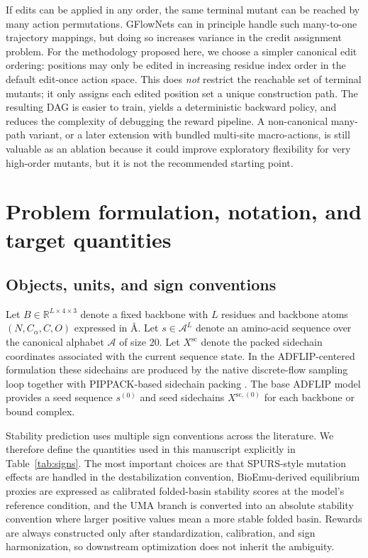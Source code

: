 \documentclass[11pt]{article}
\newcommand{\RR}{\mathbb{R}}
\newcommand{\angstrom}{\ensuremath{\text{\AA}}}
\newcommand{\Aset}{\mathcal{A}}
\begin{document}
If edits can be applied in any order, the same terminal mutant can be reached by many action permutations. GFlowNets can in principle handle such many-to-one trajectory mappings, but doing so increases variance in the credit assignment problem. For the methodology proposed here, we choose a simpler canonical edit ordering: positions may only be edited in increasing residue index order in the default edit-once action space. This does \emph{not} restrict the reachable set of terminal mutants; it only assigns each edited position set a unique construction path. The resulting DAG is easier to train, yields a deterministic backward policy, and reduces the complexity of debugging the reward pipeline. A non-canonical many-path variant, or a later extension with bundled multi-site macro-actions, is still valuable as an ablation because it could improve exploratory flexibility for very high-order mutants, but it is not the recommended starting point.

\section{Problem formulation, notation, and target quantities}
\label{sec:problem}

\subsection{Objects, units, and sign conventions}

Let $B \in \RR^{L\times 4 \times 3}$ denote a fixed backbone with $L$ residues and backbone atoms $(N,C_\alpha,C,O)$ expressed in \angstrom. Let $s \in \Aset^L$ denote an amino-acid sequence over the canonical alphabet $\Aset$ of size $20$. Let $X^{\mathrm{sc}}$ denote the packed sidechain coordinates associated with the current sequence state. In the ADFLIP-centered formulation these sidechains are produced by the native discrete-flow sampling loop together with PIPPACK-based sidechain packing \citep{yi2025adflip,randolph2024pippack}. The base ADFLIP model provides a seed sequence $s^{(0)}$ and seed sidechains $X^{\mathrm{sc},(0)}$ for each backbone or bound complex.

Stability prediction uses multiple sign conventions across the literature. We therefore define the quantities used in this manuscript explicitly in Table~\ref{tab:signs}. The most important choices are that SPURS-style mutation effects are handled in the destabilization convention, BioEmu-derived equilibrium proxies are expressed as calibrated folded-basin stability scores at the model's reference condition, and the UMA branch is converted into an absolute stability convention where larger positive values mean a more stable folded basin. Rewards are always constructed only after standardization, calibration, and sign harmonization, so downstream optimization does not inherit the ambiguity.
\end{document}
